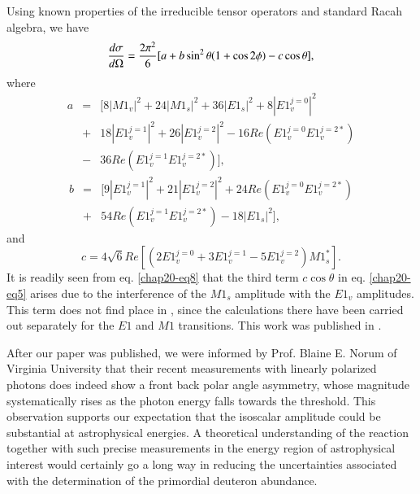 Using known properties \cite{key52} of the irreducible tensor operators and
standard Racah algebra, we have
\begin{equation}
{d\sigma \over d\Omega}={2\pi^2 \over 6} [a+b \sin^2\theta (1+\cos 2\phi) -c\cos\theta],\label{chap20-eq5}
\end{equation}
where 
\begin{eqnarray}
a &=& \big[ 8 |M1_v|^2+ 24|M1_s|^2 + 36|E1_s|^2 + 8 |E1_v^{j=0}|^2 \nonumber \\ 
	&+&18 |E1_v^{j=1}|^2 + 26 |E1_v^{j=2}|^2 -16 Re(E1_v^{j=0} E1_v^{j=2*}) \nonumber \\ 
	&-&36 Re(E1_v^{j=1} E1_v^{j=2*}) \big], \label{chap20-eq6}
\end{eqnarray}
\begin{eqnarray}
 b &=& \big[ 9 |E1_v^{j=1}|^2+21 |E1_v^{j=2}|^2 +24 Re(E1_v^{j=0} E1_v^{j=2*}) \nonumber \\
&+&54 Re(E1_v^{j=1} E1_v^{j=2*})-18|E1_s|^2 \big], \label{chap20-eq7}
\end{eqnarray}
and
\begin{equation}
c = 4\sqrt 6 Re \left[(2 E1_v^{j=0} + 3 E1_v^{j=1} -5 E1_v^{j=2})M1_s^*\right] \label{chap20-eq8}.
\end{equation}
It is readily seen from  eq. \eqref{chap20-eq8} that the third term $c \cos\theta$ in eq. \eqref{chap20-eq5} arises due to the interference of the $M1_s$ amplitude with the $E1_v$ amplitudes. This term does not find place in \cite{key49}, since the calculations there have been carried out separately for the $E1$ and $M1$ transitions.  This work was published in \cite{key54}.

After our paper was published, we were informed \cite{key55} by Prof. Blaine E. Norum of Virginia University that their recent measurements \cite{key56} with linearly polarized photons does indeed show a front back polar angle asymmetry, whose magnitude systematically rises as the photon energy falls towards the threshold. This observation supports our expectation that the isoscalar amplitude could be substantial at astrophysical energies. A theoretical understanding of the reaction together with such precise measurements in  the energy region of astrophysical interest  would certainly go a long way in reducing the uncertainties associated with the determination of the primordial deuteron abundance. 

